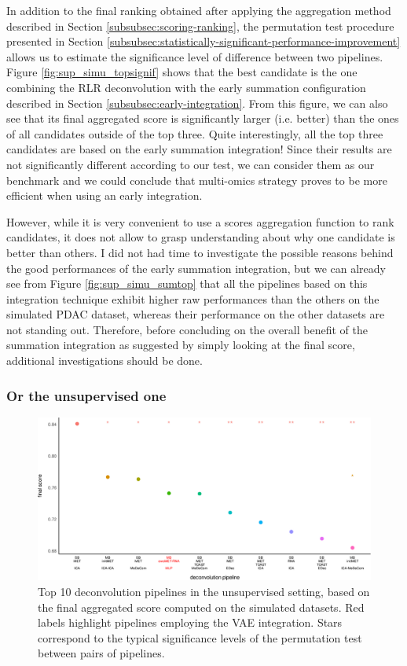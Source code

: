 \documentclass{article}
\begin{document}
In addition to the final ranking obtained after applying the aggregation method described in Section \ref{subsubsec:scoring-ranking}, the permutation test procedure presented in Section \ref{subsubsec:statistically-significant-performance-improvement} allows us to estimate the significance level of difference between two pipelines.
Figure \ref{fig:sup_simu_topsignif} shows that the best candidate is the one combining the RLR deconvolution with the early summation configuration described in Section \ref{subsubsec:early-integration}.
From this figure, we can also see that its final aggregated score is significantly larger (i.e. better) than the ones of all candidates outside of the top three.
Quite interestingly, all the top three candidates are based on the early summation integration!
Since their results are not significantly different according to our test, we can consider them as our benchmark  and we could conclude that multi-omics strategy proves to be more efficient when using an early integration.

However, while it is very convenient to use a scores aggregation function to rank candidates, it does not allow to grasp understanding about why one candidate is better than others.
I did not had time to investigate the possible reasons behind the good performances of the early summation integration, but we can already see from Figure \ref{fig:sup_simu_sumtop} that all the pipelines based on this integration technique exhibit higher raw performances than the others on the simulated PDAC dataset, whereas their performance on the other datasets are not standing out.
Therefore, before concluding on the overall benefit of the summation integration as suggested by simply looking at the final score, additional investigations should be done.

\subsubsection{Or the unsupervised one}\label{subsubsec:results-unsupervised}

\begin{figure}[htp]
    \centering
    \includegraphics[width=\textwidth,keepaspectratio]{fig/unsup_simu_topsignif.png}
    \caption{Top 10 deconvolution pipelines in the unsupervised setting, based on the final aggregated score computed on the simulated datasets. Red labels highlight pipelines employing the VAE integration. Stars correspond to the typical significance levels of the permutation test between pairs of pipelines.}
    \label{fig:unsup_simu_topsignif}
\end{figure}
\end{document}
